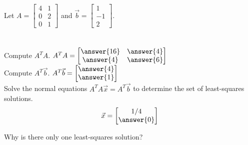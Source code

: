 \documentclass{ximera}
\begin{document}
  	  		                          \begin{question} 
  	  		                      Let $A = \begin{bmatrix} 4 &1\\0&2\\0&1\end{bmatrix}$ and $\vec{b}= \begin{bmatrix}1\\-1\\2\end{bmatrix}$.\\\\
  	  		                      \vspace{10pt}\\
  	  		                      Compute $A^TA$. $A^TA =\begin{bmatrix} \answer{16}& \answer{4}\\\answer{4}& \answer{6}\end{bmatrix}$\vspace{20pt}\\
  	  		                       Compute $A^T\vec{b}$. $A^T\vec{b} = \begin{bmatrix} \answer{4}\\\answer{1}\end{bmatrix}$\vspace{20pt}\\
  	  		                      Solve the normal equations $A^TA\vec{x} = A^T\vec{b}$ to determine the set of least-squares solutions.\\
  	  		                      $$\vec{x} = \begin{bmatrix}1/4\\ \answer{0}\end{bmatrix}$$
  	  		                      
  	  		                      Why is there only one least-squares solution?
  	  		                      
  	  		                      \begin{multipleChoice}
  	  		                      \end{multipleChoice}
  	  		                      
  	  		                      	
  	  		                      \end{question}
\end{document}
